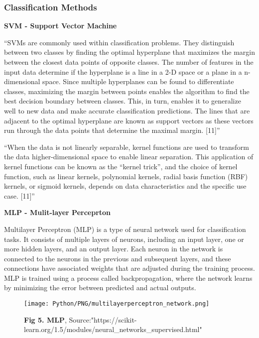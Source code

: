 \documentclass{article}
\begin{document}
\subsubsection{Classification Methods}

\textbf{SVM - Support Vector Machine}

``SVMs are commonly used within classification problems. They distinguish between two classes by finding the optimal hyperplane that maximizes the margin between the closest data points of opposite classes. The number of features in the input data determine if the hyperplane is a line in a 2-D space or a plane in a n-dimensional space. Since multiple hyperplanes can be found to differentiate classes, maximizing the margin between points enables the algorithm to find the best decision boundary between classes. This, in turn, enables it to generalize well to new data and make accurate classification predictions. The lines that are adjacent to the optimal hyperplane are known as support vectors as these vectors run through the data points that determine the maximal margin. [11]'' 

 ``When the data is not linearly separable, kernel functions are used to transform the data higher-dimensional space to enable linear separation. This application of kernel functions can be known as the “kernel trick”, and the choice of kernel function, such as linear kernels, polynomial kernels, radial basis function (RBF) kernels, or sigmoid kernels, depends on data characteristics and the specific use case. [11]'' 
\newpage



\textbf{MLP - Mulit-layer Perceprton}

\hspace{1cm}Multilayer Perceptron (MLP) is a type of neural network used for classification tasks. It consists of multiple layers of neurons, including an input layer, one or more hidden layers, and an output layer. Each neuron in the network is connected to the neurons in the previous and subsequent layers, and these connections have associated weights that are adjusted during the training process. MLP is trained using a process called backpropagation, where the network learns by minimizing the error between predicted and actual outputs.


\begin{figure}[!h]
    \centering
    \texttt{[image: Python/PNG/multilayerperceptron\_network.png]}
    \caption{\textbf{Fig 5. MLP}, Source:"https://scikit-learn.org/1.5/modules/neural\_networks\_supervised.html"}
\end{figure}
\end{document}
